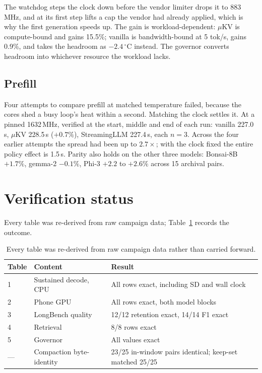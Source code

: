 \documentclass[11pt]{article}
\begin{document}
\noindent The watchdog steps the clock down before the vendor limiter drops it to 883\,MHz,
and at its first step lifts a cap the vendor had already applied, which is why the first
generation speeds up. The gain is workload-dependent: $\mu$KV is compute-bound and gains
15.5\%; vanilla is bandwidth-bound at 5 tok/s, gains 0.9\%, and takes the headroom as
$-2.4\,^\circ$C instead. The governor converts headroom into whichever resource the workload
lacks.

\subsection{Prefill}
Four attempts to compare prefill at matched temperature failed, because the cores shed a busy
loop's heat within a second. Matching the clock settles it. At a pinned 1632\,MHz, verified at
the start, middle and end of each run: vanilla 227.0\,s, $\mu$KV 228.5\,s ($+0.7\%$),
StreamingLLM 227.4\,s, each $n{=}3$. Across the four earlier attempts the spread had been up
to $2.7\times$; with the clock fixed the entire policy effect is 1.5\,s. Parity also holds on
the other three models: Bonsai-8B $+1.7\%$, gemma-2 $-0.1\%$, Phi-3 $+2.2$ to $+2.6\%$ across
15 archival pairs.

\section{Verification status}
Every table was re-derived from raw campaign data; Table~\ref{tab:verify} records the outcome.

\begin{table}[h]\centering\small
\caption{Every table was re-derived from raw campaign data rather than carried forward.}
\label{tab:verify}
\begin{tabular}{@{}lll@{}}
\toprule
\textbf{Table} & \textbf{Content} & \textbf{Result}\\
\midrule
1 & Sustained decode, CPU & All rows exact, including SD and wall clock\\
2 & Phone GPU & All rows exact, both model blocks\\
3 & LongBench quality & 12/12 retention exact, 14/14 F1 exact\\
4 & Retrieval & 8/8 rows exact\\
5 & Governor & All values exact\\
--- & Compaction byte-identity & 23/25 in-window pairs identical; keep-set matched 25/25\\
\bottomrule
\end{tabular}
\end{table}
\end{document}

